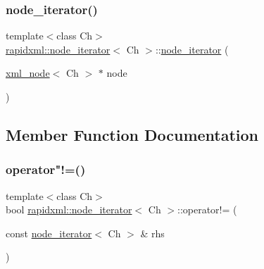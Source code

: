 \mbox{\label{classrapidxml_1_1node__iterator_a94c3da59b54e4bd003e226cc35b3c266}} 
\subsubsection{\texorpdfstring{node\+\_\+iterator()}{node\_iterator()}\hspace{0.1cm}{\footnotesize\ttfamily [4/4]}}
{\footnotesize\ttfamily template$<$class Ch$>$ \\
\mbox{\hyperlink{classrapidxml_1_1node__iterator}{rapidxml\+::node\+\_\+iterator}}$<$ Ch $>$\+::\mbox{\hyperlink{classrapidxml_1_1node__iterator}{node\+\_\+iterator}} (\begin{DoxyParamCaption}\item[{\mbox{\hyperlink{classrapidxml_1_1xml__node}{xml\+\_\+node}}$<$ Ch $>$ $\ast$}]{node }\end{DoxyParamCaption})\hspace{0.3cm}{\ttfamily [inline]}}



\subsection{Member Function Documentation}
\mbox{\label{classrapidxml_1_1node__iterator_a20f1e25347d7e3856694f18597f7c8e2}} 
\subsubsection{\texorpdfstring{operator"!=()}{operator!=()}\hspace{0.1cm}{\footnotesize\ttfamily [1/2]}}
{\footnotesize\ttfamily template$<$class Ch$>$ \\
bool \mbox{\hyperlink{classrapidxml_1_1node__iterator}{rapidxml\+::node\+\_\+iterator}}$<$ Ch $>$\+::operator!= (\begin{DoxyParamCaption}\item[{const \mbox{\hyperlink{classrapidxml_1_1node__iterator}{node\+\_\+iterator}}$<$ Ch $>$ \&}]{rhs }\end{DoxyParamCaption})\hspace{0.3cm}{\ttfamily [inline]}}


